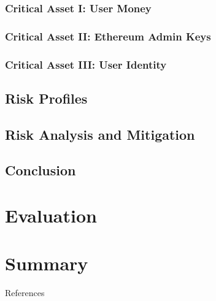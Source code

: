 \documentclass[12pt]{article} %
\begin{document}
{\subsubsection{Critical Asset I: User Money} \label{sssec:5.2:userMoney}

\subsubsection{Critical Asset II: Ethereum Admin Keys} \label{sssec:5.2:ethereumAdminKeys}

\subsubsection{Critical Asset III: User Identity} \label{sssec:5.2:userIdentity}

\subsection{Risk Profiles} \label{ssec:5.3}

\subsection{Risk Analysis and Mitigation} \label{ssec:5.4}

\subsection{Conclusion} \label{ssec:5.5}

\pagebreak

\section{Evaluation} \label{sec:6}


\pagebreak

\section{Summary} \label{sec:7}


\pagebreak

 \label{sec:refs}
{References}

\pagebreak

}
\end{document}
